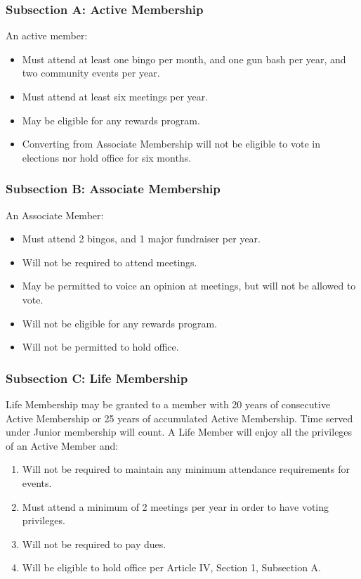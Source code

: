 ﻿\documentclass[12pt,letterpaper]{article}
\begin{document}
\subsubsection*{Subsection A: Active Membership}
An active member:
\begin{itemize}
\item Must attend at least one bingo per month, and one gun bash per year, and two community events per year.
\item Must attend at least six meetings per year.
\item May be eligible for any rewards program.
\item Converting from Associate Membership will not be eligible to vote in elections nor hold office for six months.
\end{itemize}

\subsubsection*{Subsection B: Associate Membership}
An Associate Member:
\begin{itemize}
\item Must attend 2 bingos, and 1 major fundraiser per year.
\item Will not be required to attend meetings.
\item May be permitted to voice an opinion at meetings, but will not be allowed to vote.
\item Will not be eligible for any rewards program.
\item Will not be permitted to hold office.
\end{itemize}

\subsubsection*{Subsection C: Life Membership}
Life Membership may be granted to a member with 20 years of consecutive Active Membership or 25 years of accumulated Active Membership.  Time served under Junior membership will count.  A Life Member will enjoy all the privileges of an Active Member and:
\begin{enumerate}
\item Will not be required to maintain any minimum attendance requirements for events.
\item Must attend a minimum of 2 meetings per year in order to have voting privileges.
\item Will not be required to pay dues.
\item Will be eligible to hold office per Article IV, Section 1, Subsection A.
\end{enumerate}
\end{document}
